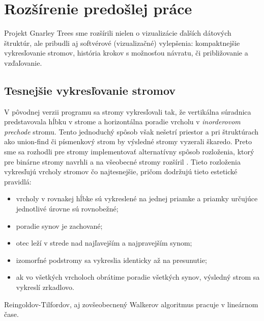 \section{Rozšírenie predošlej práce}

Projekt Gnarley Trees sme rozšírili nielen o vizualizácie ďalších dátových
štruktúr, ale pribudli aj softvérové (vizualizačné) vylepšenia:
kompaktnejšie vykresľovanie stromov, história krokov s možnosťou návratu,
či približovanie a vzďaľovanie.

\subsection{Tesnejšie vykresľovanie stromov}

V pôvodnej verzii programu sa stromy vykresľovali tak, že vertikálna súradnica 
predstavovala hĺbku v strome a horizontálna poradie vrcholu v \emph{
inorderovom prechode} stromu. Tento jednoduchý spôsob však nešetrí priestor
a pri štruktúrach ako union-find či písmenkový strom by výsledné stromy 
vyzerali škaredo. Preto sme sa rozhodli pre stromy implementovať 
alternatívny spôsob rozloženia, ktorý pre binárne stromy navrhli \citet{reingold}
a na všeobecné stromy rozšíril \citet{walker}. Tieto rozloženia vykresľujú
vrcholy stromov čo najtesnejšie, pričom dodržujú tieto estetické pravidlá: 
\begin{itemize} 
\item vrcholy v rovnakej hĺbke sú vykreslené na jednej priamke a priamky 
určujúce jednotlivé úrovne sú rovnobežné; 
\item poradie synov je zachované; 
\item otec leží v strede nad najľavejším a najpravejším synom; 
\item izomorfné podstromy sa vykreslia identicky až na presunutie;
\item ak vo všetkých vrcholoch obrátime poradie všetkých synov, výsledný strom 
sa vykreslí zrkadlovo.
\end{itemize}
Reingoldov-Tilfordov, aj zovšeobecnený Walkerov algoritmus pracuje v lineárnom
čase.
